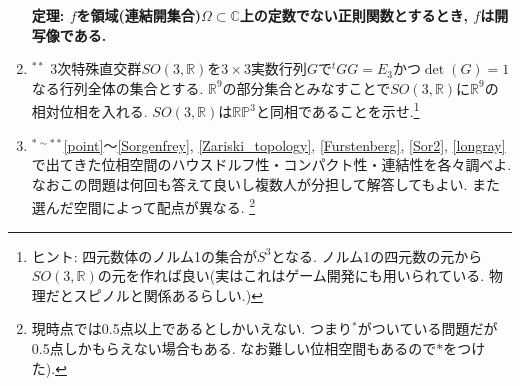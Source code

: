 \documentclass[dvipdfmx,a4paper,11pt]{article}
\newcommand{\R}{\mathbb{R}}
\newcommand{\C}{\mathbb{C}}
\theoremstyle{definition}
\begin{document}
\begin{enumerate}[label=\textbf{問}\ref*{sec-compact_continue}.\arabic*]
   \begin{tcolorbox}[
    colback = white,
    colframe = green!35!black,
    fonttitle = \bfseries,
    breakable = true]
 \bf{ 定理:}  $f$を領域(連結開集合)$\Omega \subset \C$上の定数でない正則関数とするとき, $f$は開写像である.
 \end{tcolorbox}



\item \label{so3} $^{**}$ 3次特殊直交群$SO(3,\R)$を$ 3\times 3$実数行列$G$で$^{t}GG=E_3$かつ$\det(G)=1$なる行列全体の集合とする. $\R^{9}$の部分集合とみなすことで$SO(3,\R)$に$\R^{9}$の相対位相を入れる. 
$SO(3,\R)$は$\R\mathbb{P}^{3}$と同相であることを示せ.\footnote{ヒント: 四元数体のノルム1の集合が$S^3$となる. ノルム1の四元数の元から$SO(3,\R)$の元を作れば良い(実はこれはゲーム開発にも用いられている. 物理だとスピノルと関係あるらしい.)}




\item \label{HCC}$^{* \sim **}$\ref{point}〜\ref{Sorgenfrey}, \ref{Zariski_topology}, \ref{Furstenberg}, \ref{Sor2}, \ref{longray}で出てきた位相空間のハウスドルフ性・コンパクト性・連結性を各々調べよ.
なおこの問題は何回も答えて良いし複数人が分担して解答してもよい. 
また選んだ空間によって配点が異なる. \footnote{現時点では0.5点以上であるとしかいえない. つまり$^{*}$がついている問題だが0.5点しかもらえない場合もある. なお難しい位相空間もあるので$*$をつけた).}

\end{enumerate}
\end{document}
